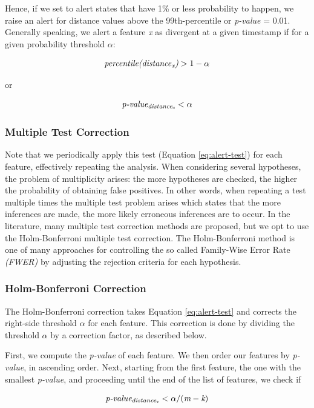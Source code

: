 Hence, if we set to alert states that have 1\% or less probability to happen, we raise an alert for distance values above the 99th-percentile or \textit{p-value} = 0.01. Generally speaking, we alert a feature \textit{x} as divergent at a given timestamp if for a given probability threshold $\alpha$:

\[ \textit{percentile(distance\textsubscript{x})} > 1 - \alpha \]

or

\begin{equation}
    \label{eq:alert-test}
    \textit{p-value\textsubscript{distance\textsubscript{x}}} < \alpha
\end{equation}

\subsubsection*{Multiple Test Correction}
Note that we periodically apply this test (Equation \ref{eq:alert-test}) for each feature, effectively repeating the analysis. When considering several hypotheses, the problem of multiplicity arises: the more hypotheses are checked, the higher the probability of obtaining false positives. In other words, when repeating a test multiple times the multiple test problem arises which states that the more inferences are made, the more likely erroneous inferences are to occur. In the literature, many multiple test correction methods are proposed, but we opt to use the Holm-Bonferroni multiple test correction. The Holm-Bonferroni method is one of many approaches for controlling the so called Family-Wise Error Rate \textit{(FWER)} by adjusting the rejection criteria for each hypothesis.


\subsubsection*{Holm-Bonferroni Correction}
The Holm-Bonferroni correction takes Equation \ref{eq:alert-test} and corrects the right-side threshold $\alpha$ for each feature. This correction is done by dividing the threshold $\alpha$ by a correction factor, as described below.

First, we compute the \textit{p-value} of each feature. We then order our features by \textit{p-value}, in ascending order. Next, starting from the first feature, the one with the smallest \textit{p-value}, and proceeding until the end of the list of features, we check if

\[  \textit{p-value\textsubscript{distance\textsubscript{x}}} < \alpha / (\textit{m} - \textit{k}) \]

